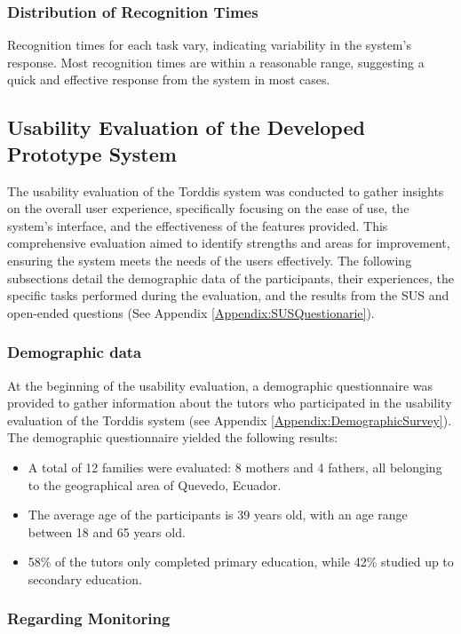 \documentclass[a4paper,fleqn]{cas-sc}
\begin{document}
			\subsubsection{Distribution of Recognition Times}
				Recognition times for each task vary, indicating variability in the system's response. Most recognition times are within a reasonable range, suggesting a quick and effective response from the system in most cases.

		\subsection{Usability Evaluation of the Developed Prototype System}
			The usability evaluation of the Torddis system was conducted to gather insights on the overall user experience, specifically focusing on the ease of use, the system's interface, and the effectiveness of the features provided. This comprehensive evaluation aimed to identify strengths and areas for improvement, ensuring the system meets the needs of the users effectively. The following subsections detail the demographic data of the participants, their experiences, the specific tasks performed during the evaluation, and the results from the SUS and open-ended questions (See Appendix \ref{Appendix:SUSQuestionarie}).

			\subsubsection{Demographic data}
				At the beginning of the usability evaluation, a demographic questionnaire was provided to gather information about the tutors who participated in the usability evaluation of the Torddis system (see Appendix \ref{Appendix:DemographicSurvey}). The demographic questionnaire yielded the following results:
				
				\begin{itemize}
					\item A total of 12 families were evaluated: 8 mothers and 4 fathers, all belonging to the geographical area of Quevedo, Ecuador.
					\item The average age of the participants is 39 years old, with an age range between 18 and 65 years old.
					\item 58\% of the tutors only completed primary education, while 42\% studied up to secondary education.
				\end{itemize}

			\subsubsection{Regarding Monitoring}
			
\end{document}
